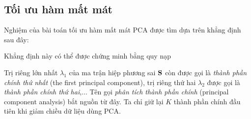 \subsection{Tối ưu hàm mất mát}
Nghiệm của bài toán tối ưu hàm mất mát PCA được tìm dựa trên khẳng định sau
đây:


Khẳng định này có thể được chứng minh bằng quy nạp

Trị riêng lớn nhất $\lambda_1$ của ma trận hiệp phương sai $\mathbf{S}$ còn được gọi
là \textit{thành
    phần chính thứ nhất} ({the first principal component}), trị riêng thứ hai
$\lambda_2$ được gọi là \textit{thành phần chính thứ hai},... Tên gọi
\textit{phân tích thành phần chính} ({principal component analysis}) bắt
nguồn từ đây. Ta chỉ giữ lại $K$ thành phần chính đầu tiên khi giảm chiều dữ
liệu dùng PCA.

